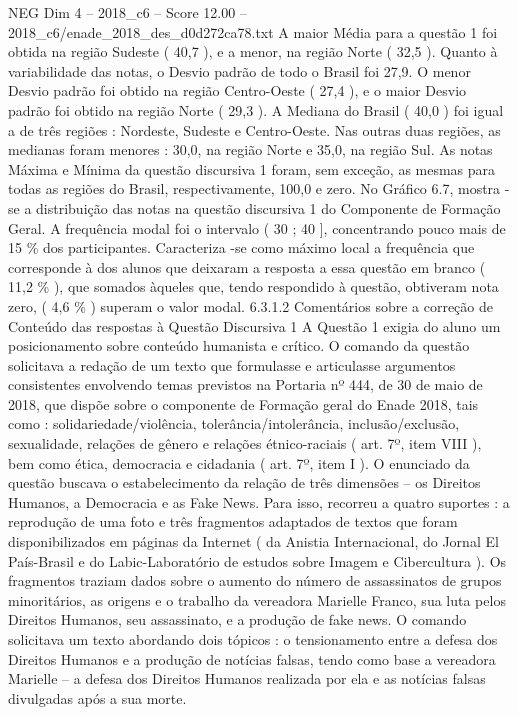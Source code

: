\begin{textsample}{NEG Dim 4 – 2018\_c6 – Score 12.00 – 2018\_c6/enade\_2018\_des\_d0d272ca78.txt}
A maior Média para a questão 1 foi obtida na região Sudeste ( 40,7 ), e a menor, na região Norte ( 32,5 ).
Quanto à variabilidade das notas, o Desvio padrão de todo o Brasil foi 27,9.
O menor Desvio padrão foi obtido na região Centro-Oeste ( 27,4 ), e o maior Desvio padrão foi obtido na região Norte ( 29,3 ).
A Mediana do Brasil ( 40,0 ) foi igual a de três regiões : Nordeste, Sudeste e Centro-Oeste.
Nas outras duas regiões, as medianas foram menores : 30,0, na região Norte e 35,0, na região Sul.
As notas Máxima e Mínima da questão discursiva 1 foram, sem exceção, as mesmas para todas as regiões do Brasil, respectivamente, 100,0 e zero.
No Gráfico 6.7, mostra -se a distribuição das notas na questão discursiva 1 do Componente de Formação Geral.
A frequência modal foi o intervalo ( 30 ; 40 ], concentrando pouco mais de 15 \% dos participantes.
Caracteriza -se como máximo local a frequência que corresponde à dos alunos que deixaram a resposta a essa questão em branco ( 11,2 \% ), que somados àqueles que, tendo respondido à questão, obtiveram nota zero, ( 4,6 \% ) superam o valor modal. 6.3.1.2 Comentários sobre a correção de Conteúdo das respostas à Questão Discursiva 1 A Questão 1 exigia do aluno um posicionamento sobre conteúdo humanista e crítico.
O comando da questão solicitava a redação de um texto que formulasse e articulasse argumentos consistentes envolvendo temas previstos na Portaria nº 444, de 30 de maio de 2018, que dispõe sobre o componente de Formação geral do Enade 2018, tais como : solidariedade/violência, tolerância/intolerância, inclusão/exclusão, sexualidade, relações de gênero e relações étnico-raciais ( art. 7º, item VIII ), bem como ética, democracia e cidadania ( art. 7º, item I ).
O enunciado da questão buscava o estabelecimento da relação de três dimensões – os Direitos Humanos, a Democracia e as Fake News.
Para isso, recorreu a quatro suportes : a reprodução de uma foto e três fragmentos adaptados de textos que foram disponibilizados em páginas da Internet ( da Anistia Internacional, do Jornal El País-Brasil e do Labic-Laboratório de estudos sobre Imagem e Cibercultura ).
Os fragmentos traziam dados sobre o aumento do número de assassinatos de grupos minoritários, as origens e o trabalho da vereadora Marielle Franco, sua luta pelos Direitos Humanos, seu assassinato, e a produção de fake news.
O comando solicitava um texto abordando dois tópicos : o tensionamento entre a defesa dos Direitos Humanos e a produção de notícias falsas, tendo como base a vereadora Marielle – a defesa dos Direitos Humanos realizada por ela e as notícias falsas divulgadas após a sua morte.

\end{textsample}
